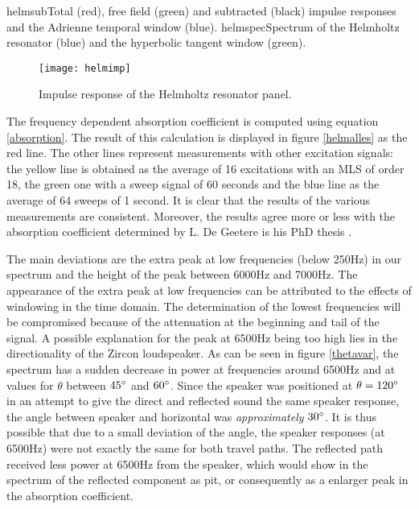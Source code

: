   

	{helmsub}{Total (red), free field (green) and subtracted (black) impulse responses and the Adrienne temporal window (blue).}
	{helmspec}{Spectrum of the Helmholtz resonator (blue) and the hyperbolic tangent window (green).}


\begin{figure}[h!]
  \centering
    \texttt{[image: helmimp]}
  \caption{Impulse response of the Helmholtz resonator panel.}
  \label{fig: helmimp}
\end{figure}

The frequency dependent absorption coefficient is computed using equation \ref{absorption}. The result of this calculation is displayed in figure \ref{helmalles} as the red line. The other lines represent measurements with other excitation signals: the yellow line is obtained as the average of 16 excitations with an MLS of order 18, the green one with a sweep signal of 60 seconds and the blue line as the average of 64 sweeps of 1 second. It is clear that the results of the various measurements are consistent. Moreover, the results agree more or less with the absorption coefficient determined by L. De Geetere is his PhD thesis \cite[p.84]{Geetere}. 

The main deviations are the extra peak at low frequencies (below 250Hz) in our spectrum and the height of the peak between 6000Hz and 7000Hz. The appearance of the extra peak at low frequencies can be attributed to the effects of windowing in the time domain. The determination of the lowest frequencies will be compromised because of the attenuation at the beginning and tail of the signal. A possible explanation for the peak at 6500Hz being too high lies in the directionality of the Zircon loudspeaker. As can be seen in figure \ref{thetavar}, the spectrum has a sudden decrease in power at frequencies around 6500Hz and at values for $\theta$ between $45^\circ$ and $60^\circ$. Since the speaker was positioned at $\theta = 120^\circ$ in an attempt to give the direct and reflected sound the same speaker response, the angle between speaker and horizontal was \emph{approximately} $30^\circ$. It is thus possible that due to a small deviation of the angle, the speaker responses (at 6500Hz) were not exactly the same for both travel paths. The reflected path received less power at 6500Hz from the speaker, which would show in the spectrum of the reflected component as pit, or consequently as a enlarger peak in the absorption coefficient.



